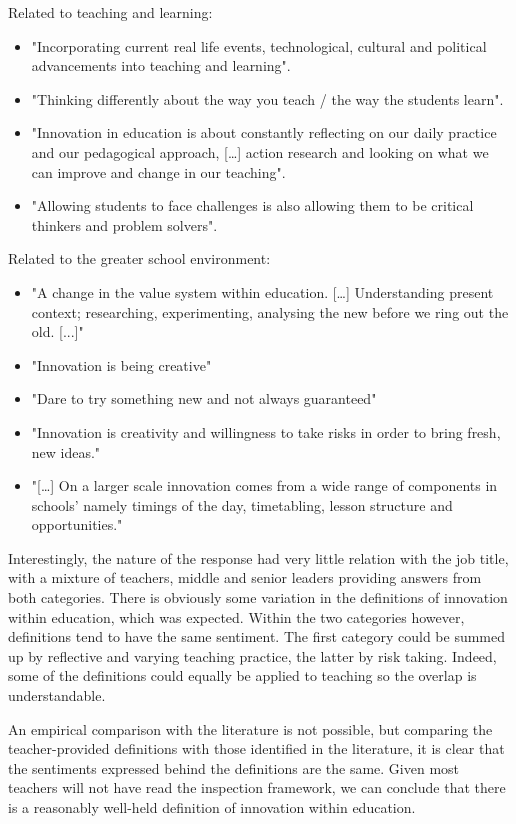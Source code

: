 Related to teaching and learning: 

\begin{itemize}
\item "Incorporating current real life events, technological, cultural and political advancements into teaching and learning".
\item "Thinking differently about the way you teach / the way the students learn".
\item "Innovation in education is about constantly reflecting on our daily practice and our pedagogical approach, […] action research and looking on what we can improve and change in our teaching".
\item "Allowing students to face challenges is also allowing them to be critical thinkers and problem solvers".
\end{itemize}

Related to the greater school environment:
\begin{itemize}
\item "A change in the value system within education. […] Understanding present context; researching, experimenting, analysing the new before we ring out the old. [...]"
\item "Innovation is being creative"
\item "Dare to try something new and not always guaranteed"
\item "Innovation is creativity and willingness to take risks in order to bring fresh, new ideas."
\item "[…] On a larger scale innovation comes from a wide range of components in schools' namely timings of the day, timetabling, lesson structure and opportunities."
\end{itemize}

Interestingly, the nature of the response had very little relation with the job title, with a mixture of teachers, middle and senior leaders providing answers from both categories. There is obviously some variation in the definitions of innovation within education, which was expected. Within the two categories however, definitions tend to have the same sentiment. The first category could be summed up by reflective and varying teaching practice, the latter by risk taking. Indeed, some of the definitions could equally be applied to teaching so the overlap is understandable.

An empirical comparison with the literature is not possible, but comparing the teacher-provided definitions with those identified in the literature, it is clear that the sentiments expressed behind the definitions are the same. Given most teachers will not have read the inspection framework, we can conclude that there is a reasonably well-held definition of innovation within education.

